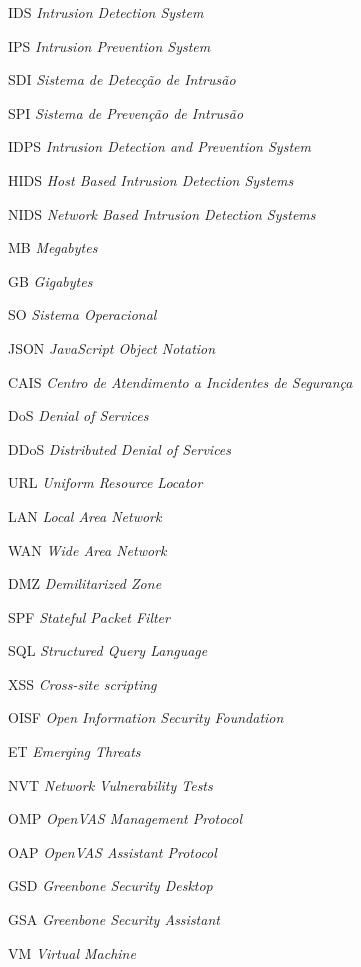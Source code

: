 \documentclass[
	12pt,				
	openright,		
	twoside,	
	a4paper,
	english,	
	brazil	
	]{abntex2}
\begin{document}
\listoffigures*
\cleardoublepage
{}
\listoftables*
\cleardoublepage
\begin{siglas}
  \item[IDS] \textit{Intrusion Detection System}
  \item[IPS] \textit{Intrusion Prevention System}
  \item[SDI] \textit{Sistema de Detecção de Intrusão}
  \item[SPI] \textit{Sistema de Prevenção de Intrusão}
  \item[IDPS] \textit{Intrusion Detection and Prevention System}
  \item[HIDS] \textit{Host Based Intrusion Detection Systems}
  \item[NIDS] \textit{Network Based Intrusion Detection Systems}
  \item[MB] \textit{Megabytes}
  \item[GB] \textit{Gigabytes}
  \item[SO] \textit{Sistema Operacional}
  \item[JSON] \textit{JavaScript Object Notation}
  \item[CAIS] \textit{Centro de Atendimento a Incidentes de Segurança}
  \item[DoS] \textit{Denial of Services}
  \item[DDoS] \textit{Distributed Denial of Services}
  \item[URL] \textit{Uniform Resource Locator}
  \item[LAN] \textit{Local Area Network}
  \item[WAN] \textit{Wide Area Network}
  \item[DMZ] \textit{Demilitarized Zone}
  \item[SPF] \textit{Stateful Packet Filter}
  \item[SQL] \textit{Structured Query Language}
  \item[XSS] \textit{Cross-site scripting}
  \item[OISF] \textit{Open Information Security Foundation}
  \item[ET] \textit{Emerging Threats}
  \item[NVT] \textit{Network Vulnerability Tests}
  \item[OMP] \textit{OpenVAS Management Protocol}
  \item[OAP] \textit{OpenVAS Assistant Protocol}
  \item[GSD] \textit{Greenbone Security Desktop}
  \item[GSA] \textit{Greenbone Security Assistant}
  \item[VM] \textit{Virtual Machine}
\end{siglas}
\tableofcontents*
\cleardoublepage
\textual





\postextual

\printindex
\end{document}
